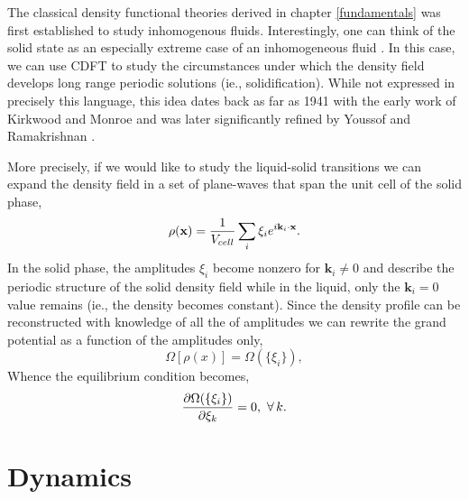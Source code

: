 The classical density functional theories derived in chapter \ref{fundamentals} was first established to study inhomogenous fluids.
Interestingly, one can think of the solid state as an especially extreme case of an inhomogeneous fluid \cite{HANSEN-CH6}.
In this case, we can use CDFT to study the circumstances under which the density field develops long range periodic solutions (ie., solidification).
While not expressed in precisely this language, this idea dates back as far as 1941 with the early work of Kirkwood and Monroe \cite{KIRKWOOD_MONROE41} and was later significantly refined by Youssof and Ramakrishnan \cite{RAMAKRISHNAN79}.

More precisely, if we would like to study the liquid-solid transitions we can expand the density field in a set of plane-waves that span the unit cell of the solid phase,
%
\begin{equation}
    \rho(\mathbf{x}) = \frac{1}{V_{cell}} \sum_i \xi_i e^{i \mathbf{k}_i \cdot \mathbf{x}}.
\end{equation}
%
In the solid phase, the amplitudes $\xi_i$ become nonzero for $\mathbf{k}_i \ne 0$ and describe the periodic structure of the solid density field while in the liquid, only the $\mathbf{k}_i = 0$ value remains (ie., the density becomes constant).
Since the density profile can be reconstructed with knowledge of all the of amplitudes we can rewrite the grand potential as a function of the amplitudes only, 
%
\begin{equation}
    \Omega[\rho(x)] = \Omega(\lbrace\xi_i\rbrace),
\end{equation}
%
Whence the equilibrium condition becomes,
%
\begin{equation}
    \frac{\partial \Omega(\lbrace\xi_i\rbrace)}{\partial \xi_k} = 0, \,\,\forall \,k.
\end{equation}

\section{Dynamics} %
